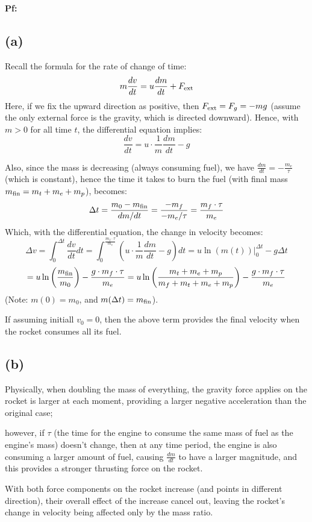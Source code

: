 \documentclass{article}
\begin{document}
\textbf{Pf:}
\subsection*{(a)}
Recall the formula for the rate of change of time:
$$m\frac{dv}{dt}=u\frac{dm}{dt}+F_{\textmd{ext}}$$
Here, if we fix the upward direction as positive, then $F_{\textmd{ext}} = F_g = -mg$ (assume the only external force is the gravity, which is directed downward). Hence, with $m>0$ for all time $t$, the differential equation implies:
$$\frac{dv}{dt}=u\cdot\frac{1}{m}\frac{dm}{dt}-g$$

Also, since the mass is decreasing (always consuming fuel), we have $\frac{dm}{dt}=-\frac{m_e}{\tau}$ (which is constant), hence the time it takes to burn the fuel (with final mass $m_{\textmd{fin}} = m_t+m_e+m_p$), becomes:
$$\Delta t = \frac{m_0 - m_{\textmd{fin}}}{dm/dt} = \frac{-m_f}{-m_e/\tau} = \frac{m_f\cdot \tau}{m_e}$$
Which, with the differential equation, the change in velocity becomes:
$$\Delta v=\int_0^{\Delta t}\frac{dv}{dt}dt = \int_0^{\frac{m_f\cdot \tau}{m_e}}\left(u\cdot\frac{1}{m}\frac{dm}{dt}-g\right)dt = u\ln(m(t))\bigg|_0^{\Delta t}-g\Delta t$$
$$=u\ln\left(\frac{m_{\textmd{fin}}}{m_0}\right)-\frac{g\cdot m_f\cdot \tau}{m_e} = u\ln\left(\frac{m_t+m_e+m_p}{m_f+m_t+m_e+m_p}\right)-\frac{g\cdot m_f\cdot \tau}{m_e}$$
(Note: $m(0) = m_0$, and $m(\Delta t)= m_\textmd{fin}$).

If assuming initiall $v_0=0$, then the above term provides the final velocity when the rocket consumes all its fuel.

\subsection*{(b)} 
Physically, when doubling the mass of everything, the gravity force applies on the rocket is larger at each moment, providing a larger negative acceleration than the original case; 

however, if $\tau$ (the time for the engine to consume the same mass of fuel as the engine's mass) doesn't change, then at any time period, the engine is also consuming a larger amount of fuel, causing $\frac{dm}{dt}$ to have a larger magnitude, and this provides a stronger thrusting force on the rocket. 

With both force components on the rocket increase (and points in different direction), their overall effect of the increase cancel out, leaving the rocket's change in velocity being affected only by the mass ratio.
\end{document}
